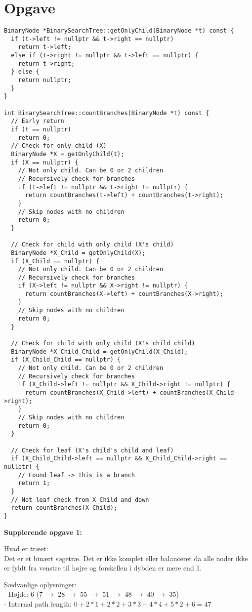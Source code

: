 \documentclass{article}
\begin{document}
\section{Opgave} %
\begin{verbatim}
BinaryNode *BinarySearchTree::getOnlyChild(BinaryNode *t) const {
  if (t->left != nullptr && t->right == nullptr)
    return t->left;
  else if (t->right != nullptr && t->left == nullptr) {
    return t->right;
  } else {
    return nullptr;
  }
}

int BinarySearchTree::countBranches(BinaryNode *t) const {
  // Early return
  if (t == nullptr)
    return 0;
  // Check for only child (X)
  BinaryNode *X = getOnlyChild(t);
  if (X == nullptr) {
    // Not only child. Can be 0 or 2 children
    // Recursively check for branches
    if (t->left != nullptr && t->right != nullptr) {
      return countBranches(t->left) + countBranches(t->right);
    }
    // Skip nodes with no children
    return 0;
  }

  // Check for child with only child (X's child)
  BinaryNode *X_Child = getOnlyChild(X);
  if (X_Child == nullptr) {
    // Not only child. Can be 0 or 2 children
    // Recursively check for branches
    if (X->left != nullptr && X->right != nullptr) {
      return countBranches(X->left) + countBranches(X->right);
    }
    // Skip nodes with no children
    return 0;
  }

  // Check for child with only child (X's child child)
  BinaryNode *X_Child_Child = getOnlyChild(X_Child);
  if (X_Child_Child == nullptr) {
    // Not only child. Can be 0 or 2 children
    // Recursively check for branches
    if (X_Child->left != nullptr && X_Child->right != nullptr) {
      return countBranches(X_Child->left) + countBranches(X_Child->right);
    }
    // Skip nodes with no children
    return 0;
  }

  // Check for leaf (X's child's child and leaf)
  if (X_Child_Child->left == nullptr && X_Child_Child->right == nullptr) {
    // Found leaf -> This is a branch
    return 1;
  }
  // Not leaf check from X_Child and down
  return countBranches(X_Child);
}
\end{verbatim}

\textbf{Supplerende opgave 1:}

Hvad er træet:\\
Det er et binært søgetræ. Det er ikke komplet eller balanceret da 
alle noder ikke er fyldt fra venstre til højre og forskellen i dybden er 
mere end 1.

Sædvanlige oplysninger:\\
- Højde: 6 (7 $\to$ 28 $\to$ 55 $\to$ 51 $\to$ 48 $\to$ 40 $\to$ 35)\\
- Internal path length: $0 + 2 * 1 + 2 * 2 + 3 * 3 + 4 * 4 + 5 * 2 + 6 = 47$
\end{document}
